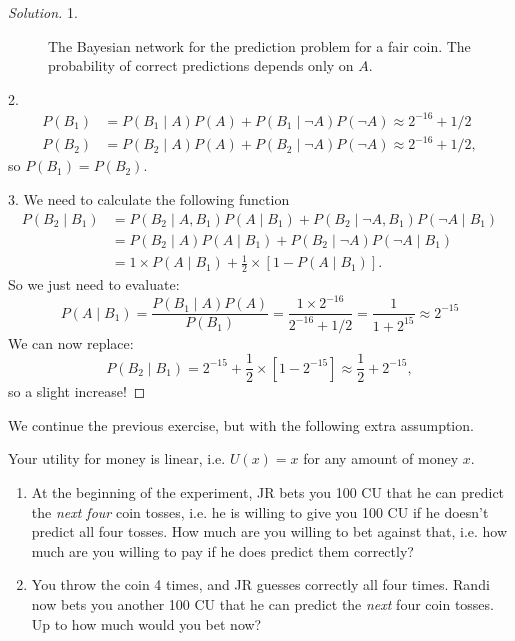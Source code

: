 \documentclass[twoside,a4paper]{article}
\begin{document}
\if{}
\begin{proof}[Solution]
  1. 
  \begin{figure}[H]
    \centering
    \caption{The Bayesian network for the prediction problem for a fair coin. The probability of correct predictions depends only on $A$.}
    \label{fig:dbn-uncertain-Randi}
  \end{figure}

  2.
  \begin{align}
    P(B_1) &=  P(B_1 \mid A) P(A) + P(B_1 \mid \neg A) P(\neg A)  \approx 2^{-16} + 1/2\\
    P(B_2) &=  P(B_2 \mid A) P(A) + P(B_2 \mid \neg A) P(\neg A) \approx 2^{-16} + 1/2,
  \end{align}
  so $P(B_1) = P(B_2)$.
  
  3. We need to calculate the following function
  \begin{align}
    P(B_2 \mid B_1)
    &=  P(B_2 \mid A, B_1) P(A \mid B_1) + P(B_2 \mid \neg A, B_1) P(\neg A \mid B_1)\\
    &=  P(B_2 \mid A) P(A \mid B_1) + P(B_2 \mid \neg A) P(\neg A \mid B_1)
    \\
    &=  1 \times P(A \mid B_1) + \frac{1}{2} \times [1 - P( A \mid B_1)].
  \end{align}
  So we just need to evaluate:
  \[
  P(A \mid B_1) = \frac{P(B_1 \mid A) P(A)}{P(B_1)} = \frac{1 \times 2^{-16}}{ 2^{-16} + 1/2} = \frac{1}{1 + 2^{15}} \approx 2^{-15}
  \]
  We can now replace:
  \[
    P(B_2 \mid B_1)
    = 2^{-15} + \frac{1}{2} \times [1 - 2^{-15}]
    \approx \frac{1}{2} + 2^{-15},
  \]
  so a slight increase!
\end{proof}



\begin{exercise}
  We continue the previous exercise, but with the following extra assumption.
  \begin{assumption}
    Your utility for money is linear, i.e. $U(x) = x$ for
    any amount of money $x$.
  \end{assumption}     
  \begin{enumerate}  
  \item At the beginning of the experiment, JR bets you 100 CU that he can predict the \emph{next four} coin tosses, i.e. he is willing to give you 100 CU if he doesn't predict all four tosses. How much are you willing to bet against that, i.e. how much are you willing to pay if he does predict them correctly?
  \item You throw the coin 4 times, and JR guesses correctly all four
    times. Randi now bets you another 100 CU that he can predict the
    \emph{next} four coin tosses. Up to how much would you bet now?
  \end{enumerate}
\end{exercise}
\end{document}
